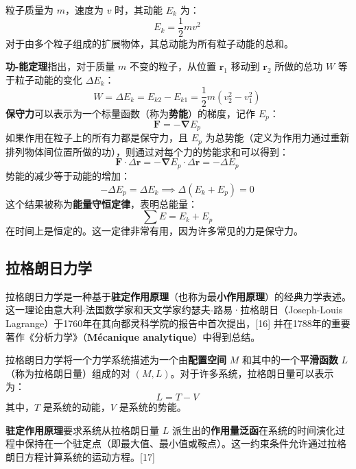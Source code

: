 粒子质量为 \( m \)，速度为 \( v \) 时，其动能 \( E_k \) 为：  
\[
E_k = \frac{1}{2} m v^2~
\]  
对于由多个粒子组成的扩展物体，其总动能为所有粒子动能的总和。  

\textbf{功-能定理}指出，对于质量 \( m \) 不变的粒子，从位置 \( \mathbf{r}_1 \) 移动到 \( \mathbf{r}_2 \) 所做的总功 \( W \) 等于粒子动能的变化 \( \Delta E_k \)：  
\[
W = \Delta E_k = E_{k2} - E_{k1} = \frac{1}{2} m \left(v_2^2 - v_1^2\right)~
\]  
\textbf{保守力}可以表示为一个标量函数（称为\textbf{势能}）的梯度，记作 \( E_p \)：  
\[
\mathbf{F} = -\mathbf{\nabla} E_p~
\]  
如果作用在粒子上的所有力都是保守力，且 \( E_p \) 为总势能（定义为作用力通过重新排列物体间位置所做的功），则通过对每个力的势能求和可以得到：  
\[
\mathbf{F} \cdot \Delta \mathbf{r} = -\mathbf{\nabla} E_p \cdot \Delta \mathbf{r} = -\Delta E_p~
\]  
势能的减少等于动能的增加：  
\[
-\Delta E_p = \Delta E_k \implies \Delta (E_k + E_p) = 0~
\]  
这个结果被称为\textbf{能量守恒定律}，表明总能量：  
\[
\sum E = E_k + E_p~
\]  
在时间上是恒定的。这一定律非常有用，因为许多常见的力是保守力。
\subsection{拉格朗日力学} 
拉格朗日力学是一种基于\textbf{驻定作用原理}（也称为最\textbf{小作用原理}）的经典力学表述。这一理论由意大利-法国数学家和天文学家约瑟夫-路易·拉格朗日（Joseph-Louis Lagrange）于1760年在其向都灵科学院的报告中首次提出，[16] 并在1788年的重要著作《分析力学》（\textbf{Mécanique analytique}）中得到总结。  

拉格朗日力学将一个力学系统描述为一个由\textbf{配置空间} \( M \) 和其中的一个\textbf{平滑函数} \( L \)（称为拉格朗日量）组成的对 \( (M, L) \)。对于许多系统，拉格朗日量可以表示为：  
\[
L = T - V~
\]  
其中，\( T \) 是系统的动能，\( V \) 是系统的势能。  

\textbf{驻定作用原理}要求系统从拉格朗日量 \( L \) 派生出的\textbf{作用量泛函}在系统的时间演化过程中保持在一个驻定点（即最大值、最小值或鞍点）。这一约束条件允许通过拉格朗日方程计算系统的运动方程。[17]